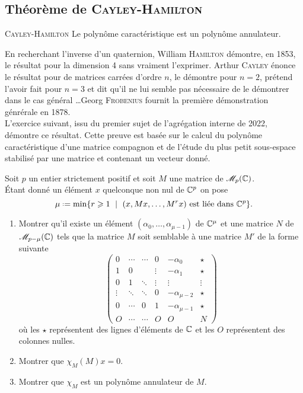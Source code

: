\subsection{Théorème de \textsc{Cayley}-\textsc{Hamilton}}

\begin{theo}{\textsc{Cayley}-\textsc{Hamilton}}
    Le polynôme caractéristique est un polynôme annulateur.
\end{theo}

En recherchant l'inverse d'un quaternion, William \textsc{Hamilton} démontre, en 1853, le résultat pour la dimension 4 sans vraiment l'exprimer. Arthur \textsc{Cayley} énonce le résultat pour de matrices carrées d'ordre $n$, le démontre pour $n=2$, prétend l'avoir fait pour $n=3$ et dit qu'il ne lui semble pas nécessaire de le démontrer dans le cas général \dots Georg \textsc{Frobenius} fournit la première démonstration génrérale en 1878. \\

L'exercice suivant, issu du premier sujet de l'agrégation interne de 2022, démontre ce résultat. Cette preuve est basée sur le calcul du polynôme caractéristique d'une matrice compagnon et de l'étude du plus petit sous-espace stabilisé par une matrice et contenant un vecteur donné. \\

\begin{exercice}
    Soit $p$ un entier strictement positif et soit $M$ une matrice de $\mathscr{M}_p(\mathbb{C})$. \\
    Étant donné un élément $x$ quelconque non nul de $\mathbb{C}^p$ on pose
    $$\mu \defeq \min \{ r \geqslant 1\ \mid\ (x, Mx, \dots, M^r x) \text{ est liée dans } \C^p\}.$$
    \begin{enumerate}
        \item Montrer qu'il existe un élément $(\alpha_0, \dots, \alpha_{\mu-1})$ de $\mathbb{C}^{\mu}$ et une matrice $N$ de $\mathscr{M}_{p-\mu}(\mathbb{C})$ tels que la matrice $M$ soit semblable à une matrice $M'$ de la forme suivante
        $$
        \begin{pmatrix}
        0 & \cdots & \cdots & 0 & -\alpha_0 & \star \\
        1 & 0 & & \vdots & -\alpha_1 & \star \\
        0 & 1 & \ddots & \vdots & \vdots & \vdots \\
        \vdots & \ddots & \ddots & 0 & -\alpha_{\mu-2} & \star \\
        0 & \cdots & 0 & 1 & -\alpha_{\mu-1} & \star \\
        O & \cdots & \cdots & O & O & N
        \end{pmatrix}
        $$
        où les $\star$ représentent des lignes d'éléments de $\mathbb{C}$ et les $O$ représentent des colonnes nulles. 
        \item Montrer que $\chi_M(M)x = 0$.
        \item Montrer que $\chi_M$ est un polynôme annulateur de $M$.
    \end{enumerate}
\end{exercice}

